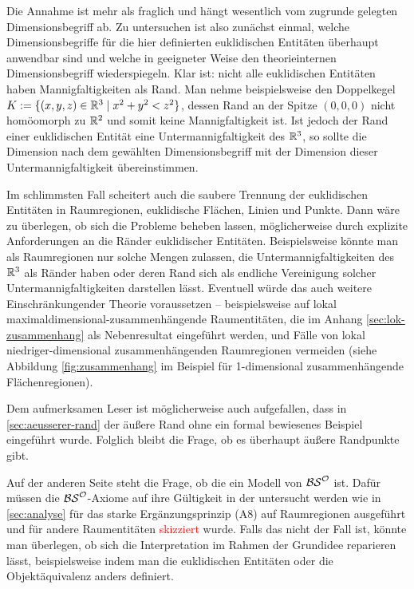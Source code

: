     Die
    Annahme ist mehr als fraglich und hängt wesentlich vom zugrunde gelegten Dimensionsbegriff ab.
    Zu untersuchen ist also zunächst einmal, welche Dimensionsbegriffe für die hier definierten euklidischen Entitäten überhaupt anwendbar sind und welche in geeigneter Weise den theorieinternen Dimensionsbegriff wiederspiegeln.
    Klar ist: nicht alle euklidischen Entitäten haben Mannigfaltigkeiten als Rand.
    Man nehme beispielsweise den Doppelkegel $K := \{(x,y,z) \in \mathbb{R}^3 \mid x^2+y^2 < z^2\}$, dessen Rand an der Spitze $(0,0,0)$ nicht homöomorph zu $\mathbb{R}^2$ und somit keine Mannigfaltigkeit ist.
    Ist jedoch der Rand einer euklidischen Entität eine Untermannigfaltigkeit des $\mathbb{R}^3$, so sollte die Dimension nach dem gewählten Dimensionsbegriff mit der Dimension dieser Untermannigfaltigkeit übereinstimmen.
    
    Im
    schlimmsten Fall scheitert auch die saubere Trennung der euklidischen Entitäten in Raumregionen, euklidische Flächen, Linien und Punkte.
    Dann wäre zu überlegen, ob sich die Probleme beheben lassen, möglicherweise durch explizite Anforderungen an die Ränder euklidischer Entitäten. 
    Beispielsweise könnte man als Raumregionen nur solche Mengen zulassen, die Untermannigfaltigkeiten des $\mathbb{R}^3$ als Ränder haben oder deren Rand sich als endliche Vereinigung solcher Untermannigfaltigkeiten darstellen lässt.
    Eventuell würde das auch weitere Einschränkungender Theorie voraussetzen -- beispielsweise auf lokal maximaldimensional-zusammenhängende Raumentitäten, die im Anhang \ref{sec:lok-zusammenhang} als Nebenresultat eingeführt werden, und Fälle von lokal niedriger-dimensional zusammenhängenden Raumregionen vermeiden (siehe Abbildung \ref{fig:zusammenhang} im Beispiel für 1-dimensional zusammenhängende Flächenregionen).
    
    Dem
    aufmerksamen Leser ist möglicherweise auch aufgefallen, dass in \ref{sec:aeusserer-rand} der äußere Rand ohne ein formal bewiesenes Beispiel eingeführt wurde.
    Folglich bleibt die Frage, ob es überhaupt äußere Randpunkte gibt.
    
    Auf
    der anderen Seite steht die Frage, ob die \strukt ein Modell von $\mathcal{BS}^{\mathcal{O}}$ ist. Dafür müssen die $\mathcal{BS}^{\mathcal{O}}$-Axiome auf ihre Gültigkeit in der \strukt untersucht werden wie in \ref{sec:analyse} für das starke Ergänzungsprinzip (A8) auf Raumregionen ausgeführt und für andere Raumentitäten \textcolor{red}{skizziert} wurde.
    Falls das nicht der Fall ist, könnte man überlegen, ob sich die Interpretation im Rahmen der Grundidee reparieren lässt, beispielsweise indem man die euklidischen Entitäten oder die Objektäquivalenz anders definiert.
    
